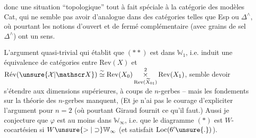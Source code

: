 
donc une situation ``topologique'' tout à fait spéciale à la catégorie des modèles Cat, qui ne semble pas avoir d'analogue dans des catégories telles que Esp ou $\Delta^{\wedge}$, où pourtant les notions d'ouvert et de fermé complémentaire (avec grains de sel  $\Delta^{\wedge}$) ont un sens.

L'argument  quasi-trivial qui établit que $(**)$  est dans $\mathbb W_1$, i.e. induit une équivalence de catégories entre $\mathrm{Rev}(X)$ et $\mathrm{R\acute{e}v}(\unsure{\mathcal X|\mathscr X})\overset{\sim}{\simeq}\mathrm{Rev}(X_0)\mathop{\times}\limits^{2}_{\mathrm{Rev}(\widetilde X_{01})}\mathrm{Rev}(X_1)$,  semble devoir s'étendre aux dimensions supérieures, à coups de $n$-gerbes  -- mais les fondements sur la théorie des $n$-gerbes  manquent, (Et je n'ai pas le courage d'expliciter l'argument pour $n=2$ (où pourtant Giraud fournit ce qu'il faut.) Aussi je conjecture que $\varphi$ est  au moins dans $\mathbb W_\infty$, i.e. que le diagramme $(*)$ est $W$-cocartésien si $W\unsure{>|\supset}\mathbb W_\infty$ (et satisfait $\mathrm{Loc}(6'\unsure{.})$).

